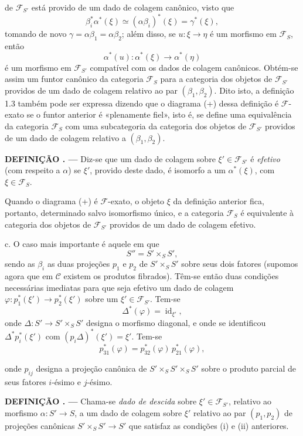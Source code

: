 \documentclass[11pt,twoside,openany]{book}
\numberwithin{equation}{section}
\newcommand{\src}[1]{%
  \phantomsection\hypertarget{src:#1}{}%
  \marginpar{\raggedleft\footnotesize\sffamily #1}%
}
\theoremstyle{plain}
\theoremstyle{definition}
\theoremstyle{remark}
\newcommand{\result}[2]{%
  \par\medskip\noindent\textbf{#1%
  \if\relax\detokenize{#2}\relax\else\space#2\fi. ---}\enspace
}
\newcommand{\FgaUnitKey}{frontmatter}
\renewcommand{\src}[1]{%
  \phantomsection\hypertarget{src:\FgaUnitKey:#1}{}%
  \marginpar{\raggedleft\footnotesize\sffamily #1}%
}
\begin{document}
\src{302}
de $\mathcal F_{S'}$ está provido de um dado de colagem canônico, visto que
\[
  \beta_i^*\alpha^*(\xi)\simeq(\alpha\beta_i)^*(\xi)=\gamma^*(\xi),
\]
tomando de novo $\gamma=\alpha\beta_1=\alpha\beta_2$; além disso, se
$u:\xi\longrightarrow\eta$ é um morfismo em $\mathcal F_S$, então
\[
  \alpha^*(u):\alpha^*(\xi)\longrightarrow\alpha^*(\eta)
\]
é um morfismo em $\mathcal F_{S'}$ compatível com os dados de colagem
canônicos. Obtém-se assim um funtor canônico da categoria $\mathcal F_S$ para
a categoria dos objetos de $\mathcal F_{S'}$ providos de um dado de colagem
relativo ao par $(\beta_1,\beta_2)$. Dito isto, a definição 1.3 também
pode ser expressa dizendo que o diagrama (+) dessa definição é
$\mathcal F$-exato se o funtor anterior é «plenamente fiel», isto é, se
define uma equivalência da categoria $\mathcal F_S$ com uma subcategoria da
categoria dos objetos de $\mathcal F_{S'}$ providos de um dado de colagem
relativo a $(\beta_1,\beta_2)$.

\result{DEFINIÇÃO}{1.5} Diz-se que um dado de colagem sobre
$\xi'\in\mathcal F_{S'}$ é \emph{efetivo} (com respeito a $\alpha$) se
$\xi'$, provido deste dado, é isomorfo a um $\alpha^*(\xi)$, com
$\xi\in\mathcal F_S$.

Quando o diagrama (+) é $\mathcal F$-exato, o objeto $\xi$ da definição
anterior fica, portanto, determinado salvo isomorfismo único, e a categoria
$\mathcal F_S$ é equivalente à categoria dos objetos de
$\mathcal F_{S'}$ providos de um dado de colagem efetivo.

\medskip\noindent
c. O caso mais importante é aquele em que
\[
  S''=S'\times_S S',
\]
sendo as $\beta_i$ as duas projeções $p_1$ e $p_2$ de
$S'\times_S S'$ sobre seus dois fatores (supomos agora que em
$\mathcal C$ existem os produtos fibrados). Têm-se então duas
condições necessárias imediatas para que seja efetivo um dado de colagem
$\varphi:p_1^*(\xi')\longrightarrow p_2^*(\xi')$ sobre um
$\xi'\in\mathcal F_{S'}$. Tem-se
\[
  \tag{i}
  \Delta^*(\varphi)=\operatorname{id}_{\xi'},
\]
onde $\Delta:S'\longrightarrow S'\times_S S'$ designa o morfismo diagonal,
e onde se identificou $\Delta^*p_i^*(\xi')$ com
$(p_i\Delta)^*(\xi')=\xi'$. Tem-se
\[
  \tag{ii}
  p_{31}^*(\varphi)=p_{32}^*(\varphi)\,p_{21}^*(\varphi),
\]

\src{303}
onde $p_{ij}$ designa a projeção canônica de
$S'\times_S S'\times_S S'$ sobre o produto parcial de seus fatores
$i$-ésimo e $j$-ésimo.

\result{DEFINIÇÃO}{1.6} Chama-se \emph{dado de descida} sobre
$\xi'\in\mathcal F_{S'}$, relativo ao morfismo
$\alpha:S'\longrightarrow S$, a um dado de colagem sobre $\xi'$ relativo ao par
$(p_1,p_2)$ de projeções canônicas
$S'\times_S S'\longrightarrow S'$ que satisfaz as condições (i) e (ii)
anteriores.
\end{document}
